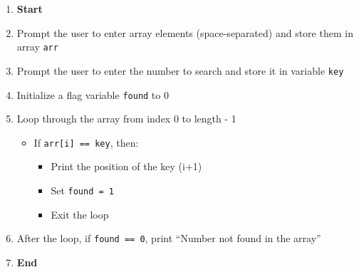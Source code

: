 \begin{enumerate}
    \item \textbf{Start}
    \item Prompt the user to enter array elements (space-separated) and store them in array \texttt{arr}
    \item Prompt the user to enter the number to search and store it in variable \texttt{key}
    \item Initialize a flag variable \texttt{found} to 0
    \item Loop through the array from index 0 to length - 1
    \begin{itemize}
        \item If \texttt{arr[i] == key}, then:
        \begin{itemize}
            \item Print the position of the key (i+1)
            \item Set \texttt{found = 1}
            \item Exit the loop
        \end{itemize}
    \end{itemize}
    \item After the loop, if \texttt{found == 0}, print ``Number not found in the array''
    \item \textbf{End}
\end{enumerate}

